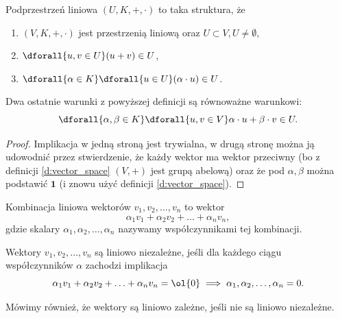 \begin{definition}
    Podprzestrzeń liniowa $(U, K, +, \cdot)$ to taka struktura, że
    \begin{enumerate}
        \item $(V, K, +, \cdot)$ jest przestrzenią liniową oraz $U \subset V, U \neq \emptyset$,
        \item $\dforall{u, v \in U} (u + v) \in U$,
        \item $\dforall{\alpha \in K} \dforall{u \in U} (\alpha \cdot u) \in U$.
    \end{enumerate}
\end{definition}

\begin{fact}
    \label{f:equivalent subspace characteristics}
    Dwa ostatnie warunki z powyższej definicji są równoważne warunkowi:
    \[ \dforall{\alpha, \beta \in K} \dforall{u, v \in V} \alpha \cdot u + \beta \cdot v \in U. \]
\end{fact}
\begin{proof}
    Implikacja w jedną stroną jest trywialna, w drugą stronę można ją udowodnić przez stwierdzenie, że każdy wektor ma wektor przeciwny (bo z definicji \ref{d:vector_space} $(V, +)$ jest grupą abelową) oraz że pod $\alpha, \beta$ można podstawić $\symbf{1}$ (i znowu użyć definicji \ref{d:vector_space}).
\end{proof}

\begin{definition}
    Kombinacja liniowa wektorów $v_1, v_2, \ldots, v_n$ to wektor
    \[ \alpha_1v_1 + \alpha_2v_2 + \ldots + \alpha_nv_n, \]
    gdzie skalary $\alpha_1, \alpha_2, \ldots, \alpha_n$ nazywamy współczynnikami tej kombinacji.
\end{definition}

\begin{definition}
    Wektory $v_1, v_2, \ldots, v_n$ są liniowo niezależne, jeśli dla każdego ciągu współczynników $\alpha$ zachodzi implikacja
    \[ \alpha_1v_1 + \alpha_2v_2 + \ldots + \alpha_nv_n = \ol{0} \implies \alpha_1, \alpha_2, \ldots, \alpha_n = 0. \]
\end{definition}
Mówimy również, że wektory są liniowo zależne, jeśli nie są liniowo niezależne.

